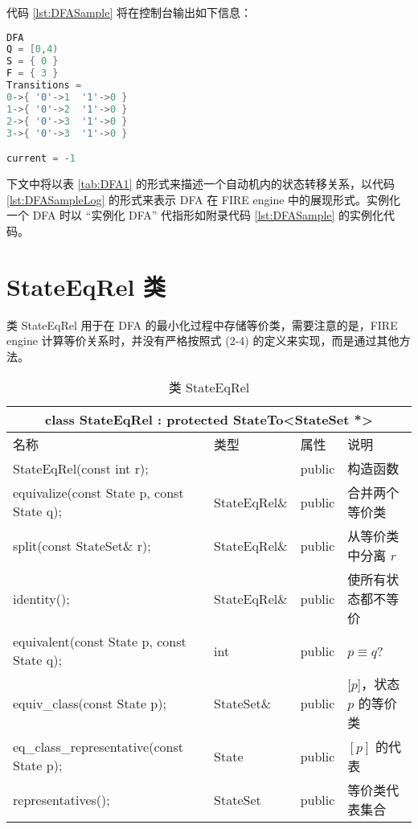 
	

代码 \ref{lst:DFASample} 将在控制台输出如下信息：

\begin{lstlisting}[language=C++,label={lst:DFASampleLog},caption={图\ref{fig:DFA1}中自动机在 FIRE engine 中的表现形式}]
DFA
Q = [0,4)
S = { 0 }
F = { 3 }
Transitions =
0->{ '0'->1  '1'->0 }
1->{ '0'->2  '1'->0 }
2->{ '0'->3  '1'->0 }
3->{ '0'->3  '1'->0 }

current = -1
\end{lstlisting}

下文中将以表 \ref{tab:DFA1} 的形式来描述一个自动机内的状态转移关系，以代码 \ref{lst:DFASampleLog} 的形式来表示 DFA 在 FIRE engine 中的展现形式。实例化一个 DFA 时以 “实例化 DFA” 代指形如附录代码 \ref{lst:DFASample} 的实例化代码。%

\section{ StateEqRel 类}\label{sec:stateeqrel-def}

类 StateEqRel 用于在 DFA 的最小化过程中存储等价类，需要注意的是，FIRE engine 计算等价关系时，并没有严格按照式 (2-4) 的定义来实现，而是通过其他方法。

\begin{table}[!htbp]
    \caption{类 StateEqRel}
    \label{tab:Class-StateEqRel}
    \centering
    \small%
    \setlength{\tabcolsep}{4pt}%
    \renewcommand{\arraystretch}{1.2}%
        \begin{tabular}{llll} %
        \toprule 
         \multicolumn{4}{c}{class StateEqRel : protected StateTo<StateSet *>} \\
        \midrule
        名称& 类型 & 属性  &\mbox{说明} \\
        \midrule 
        StateEqRel(const int r); & & public & 构造函数 \\
        equivalize(const State p, const State q); & StateEqRel\& & public & 合并两个等价类 \\
        split(const StateSet\& r); & StateEqRel\& & public & 从等价类中分离 $r$ \\
        identity(); & StateEqRel\& & public & 使所有状态都不等价 \\
        equivalent(const State p, const State q); & int & public & $p\equiv q $? \\
        equiv\_class(const State p); & StateSet\& & public & $[p$]，状态 $p$ 的等价类 \\
        eq\_class\_representative(const State p); & State & public & $[p]$ 的代表 \\
        representatives(); & StateSet & public & 等价类代表集合 \\
        \bottomrule 
    \end{tabular}
\end{table}

